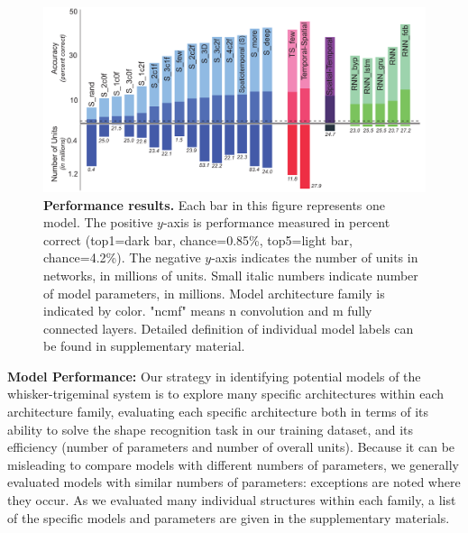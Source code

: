 \begin{figure}[h]
\FigCenter
\includegraphics [width=\DefaultFigSize\linewidth]{figures/results.pdf}
\vspace{-3mm}
\caption{\footnotesize{\textbf{Performance results.} Each bar in this figure represents one model. The positive $y$-axis is performance measured in percent correct (top1=dark bar, chance=0.85\%, top5=light bar, chance=4.2\%).  The negative $y$-axis indicates the number of units in networks, in millions of units.  Small italic numbers indicate number of model parameters, in millions. Model architecture family is indicated by color. "ncmf" means n convolution and m fully connected layers. Detailed definition of individual model labels can be found in supplementary material.}~\label{fig_main}}
\vspace{-5mm}
\end{figure}

\textbf{Model Performance:} 
Our strategy in identifying potential models of the whisker-trigeminal system is to explore many specific architectures within each architecture family, evaluating each specific architecture both in terms of its ability to solve the shape recognition task in our training dataset, and its efficiency (number of parameters and number of overall units).
Because it can be misleading to compare models with different numbers of parameters, we generally evaluated models with similar numbers of parameters: exceptions are noted where they occur.
As we evaluated many individual structures within each family, a list of the specific models and parameters are given in the supplementary materials.



